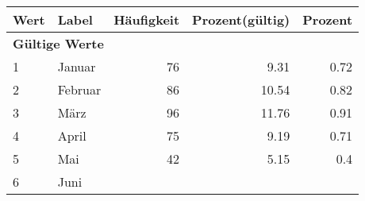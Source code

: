      \begin{longtable}{lXrrr}
     \toprule
     \textbf{Wert} & \textbf{Label} & \textbf{Häufigkeit} & \textbf{Prozent(gültig)} & \textbf{Prozent} \\
     \endhead
     \midrule
     \multicolumn{5}{l}{\textbf{Gültige Werte}}\\

     1 &
     \multicolumn{1}{X}{ Januar   } &


       \num{76} &
       \num[round-mode=places,round-precision=2]{9.31} &
         \num[round-mode=places,round-precision=2]{0.72} \\

     2 &
     \multicolumn{1}{X}{ Februar   } &


       \num{86} &
       \num[round-mode=places,round-precision=2]{10.54} &
         \num[round-mode=places,round-precision=2]{0.82} \\

     3 &
     \multicolumn{1}{X}{ März   } &


       \num{96} &
       \num[round-mode=places,round-precision=2]{11.76} &
         \num[round-mode=places,round-precision=2]{0.91} \\

     4 &
     \multicolumn{1}{X}{ April   } &


       \num{75} &
       \num[round-mode=places,round-precision=2]{9.19} &
         \num[round-mode=places,round-precision=2]{0.71} \\

     5 &
     \multicolumn{1}{X}{ Mai   } &


       \num{42} &
       \num[round-mode=places,round-precision=2]{5.15} &
         \num[round-mode=places,round-precision=2]{0.4} \\

     6 &
     \multicolumn{1}{X}{ Juni   } &



\end{longtable}
